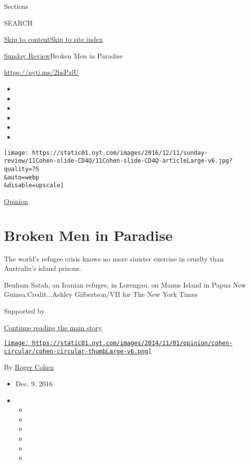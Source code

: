 Sections

SEARCH

\protect\hyperlink{site-content}{Skip to
content}\protect\hyperlink{site-index}{Skip to site index}

\href{/section/opinion/sunday}{Sunday Review}\textbar{}Broken Men in
Paradise

\url{https://nyti.ms/2hsPzlU}

\begin{itemize}
\item
\item
\item
\item
\item
\item
\end{itemize}

\texttt{[image: https://static01.nyt.com/images/2016/12/11/sunday-review/11Cohen-slide-CD4Q/11Cohen-slide-CD4Q-articleLarge-v6.jpg?quality=75\\\&auto=webp\\\&disable=upscale]}

\href{/section/opinion}{Opinion}

\hypertarget{broken-men-in-paradise}{%
\section{Broken Men in Paradise}\label{broken-men-in-paradise}}

The world's refugee crisis knows no more sinister exercise in cruelty
than Australia's island prisons.

Benham Satah, an Iranian refugee, in Lorengau, on Manus Island in Papua
New Guinea.Credit...Ashley Gilbertson/VII for The New York Times

Supported by

\protect\hyperlink{after-sponsor}{Continue reading the main story}

\href{https://www.nytimes.com/by/roger-cohen}{\texttt{[image: https://static01.nyt.com/images/2014/11/01/opinion/cohen-circular/cohen-circular-thumbLarge-v6.png]}}

By \href{https://www.nytimes.com/by/roger-cohen}{Roger Cohen}

\begin{itemize}
\item
  Dec. 9, 2016
\item
  \begin{itemize}
  \item
  \item
  \item
  \item
  \item
  \item
  \end{itemize}
\end{itemize}

